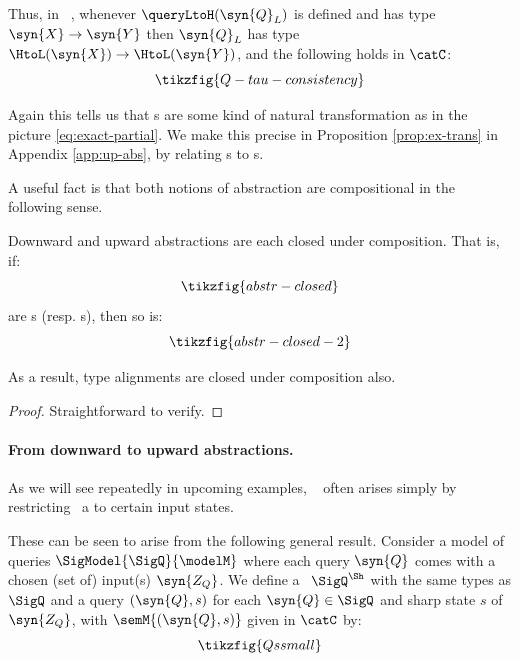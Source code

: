 \documentclass{article}
\begin{document}
Thus, in \ \qup, whenever $\queryLtoH(\syn{Q}_L)$ is defined and has type $\syn{X} \to \syn{Y}$ then $\syn{Q}_L$ has type $\HtoL(\syn{X}) \to \HtoL(\syn{Y})$, and the following holds in $\catC$:  
\begin{equation} \label{eq:consistency-condition}
\tikzfig{Q-tau-consistency}
\end{equation}


Again this tells us that \qup s are some kind of natural transformation as in the picture \eqref{eq:exact-partial}. We make this precise in Proposition \ref{prop:ex-trans} in Appendix \ref{app:up-abs}, by relating \qup s to \qdown s. 
 
A useful fact is that both notions of abstraction are compositional in the following sense.


\begin{proposition}  
Downward and upward abstractions are each closed under composition. That is, if:
\[
\tikzfig{abstr-closed}
\] 
are \qdown{}s (resp. \qup{}s), then so is: 
\[
\tikzfig{abstr-closed-2}
\]
\end{proposition}


As a result, type alignments are closed under composition also. 

\begin{proof}
	Straightforward to verify. 
\end{proof}


\paragraph{From downward to upward abstractions.} As we will see repeatedly in upcoming examples, \ \qup{} often arises simply by restricting \ a \qdown{} to certain input states. 


These can be seen to arise from the following general result. Consider a model of queries $\SigModel{\SigQ}{\modelM}$ where each query $\syn{Q}$ comes with a chosen (set of) input(s) $\syn{Z_Q}$. 
We define a \ $\SigQ^{\Sh}$ with the same types as $\SigQ$ and a query $(\syn{Q},s)$ for each $\syn{Q} \in \SigQ$ and sharp state $s$ of $\syn{Z_Q}$, with 
$\semM{(\syn{Q},s)}$ given in $\catC$ by:
\[
\tikzfig{Qssmall}
\]
\end{document}
